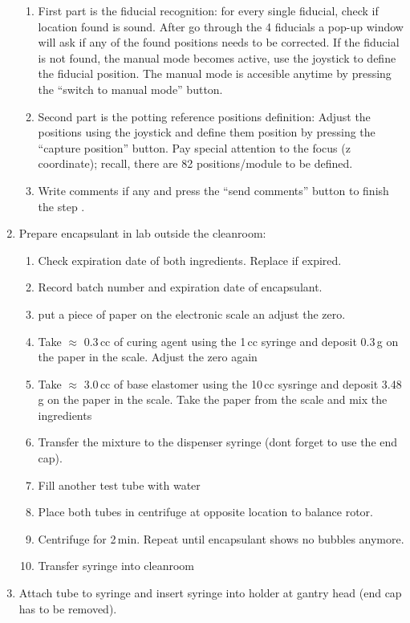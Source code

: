 \documentclass[12pt]{unlsilabsop}
\begin{document}
\begin{enumerate}
\begin{enumerate}
    \item First part is the fiducial recognition: for every single fiducial, check if location found is sound. After go through the 4 fiducials a pop-up window will ask if any of the found positions needs to be corrected. If the fiducial is not found, the manual mode becomes active, use the joystick to define the fiducial position. The manual mode is accesible anytime by pressing the ``switch to manual mode'' button.   
    \item Second part is the potting reference positions definition: Adjust the positions using the joystick and define them position by pressing the ``capture position'' button. Pay special attention to the focus (z coordinate); recall, there are 82 positions/module to be defined. 
    \item Write comments if any and press the ``send comments'' button to finish the step .
    \end{enumerate}
  \item Prepare encapsulant in lab outside the cleanroom:\label{enum:prepencapsulant}
    \begin{enumerate}
        \item Check expiration date of both ingredients. Replace if expired.
	\item Record batch number and expiration date of encapsulant.
        \item put a piece of paper on the electronic scale an adjust the zero.
	\item Take $\approx$ 0.3\,cc of curing agent using the 1\,cc syringe and deposit 0.3\,g on the paper in the scale. Adjust the zero again 
        \item Take $\approx$ 3.0\,cc of base elastomer using the 10\,cc sysringe and deposit 3.48\,g on the paper in the scale. Take the paper from the scale and mix the ingredients
        \item Transfer the mixture to the dispenser syringe (dont forget to use the end cap).  
	\item Fill another test tube with water
	\item Place both tubes in centrifuge at opposite location to balance rotor.
	\item Centrifuge for 2\,min. Repeat until encapsulant shows no bubbles anymore.
	\item Transfer syringe into cleanroom
    \end{enumerate}
    \item Attach tube to syringe and insert syringe into holder at gantry head (end cap has to be removed).

\end{enumerate}
\end{document}

